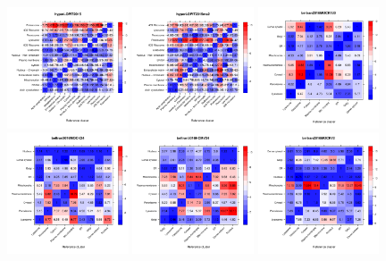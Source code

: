 \documentclass[12pt]{article}\usepackage[]{graphicx}\usepackage[]{color}
\begin{document}
\begin{appendices}
\begin{figure}[htb]
  \includegraphics[width = 0.32\textwidth]{./figure/allhmaps-5.pdf}
  \includegraphics[width = 0.32\textwidth]{./figure/allhmaps-6.pdf}
  \includegraphics[width = 0.32\textwidth]{./figure/allhmaps-7.pdf}
  \includegraphics[width = 0.32\textwidth]{./figure/allhmaps-8.pdf}
  \includegraphics[width = 0.32\textwidth]{./figure/allhmaps-9.pdf}
  \includegraphics[width = 0.32\textwidth]{./figure/allhmaps-10.pdf}

\end{figure}
\end{appendices}
\end{document}
